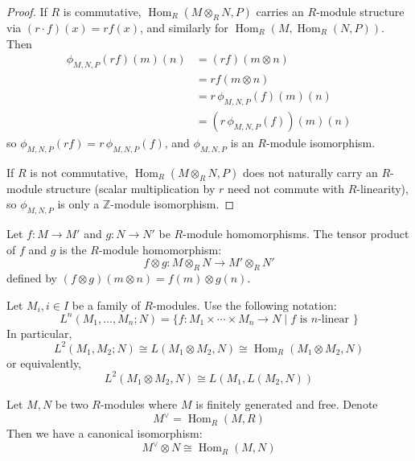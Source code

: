 \begin{proof}
    If $R$ is commutative, $\operatorname{Hom}_R(M\otimes_R N, P)$ carries an $R$-module structure via $(r\cdot f)(x) = rf(x)$, and similarly for $\operatorname{Hom}_R(M, \operatorname{Hom}_R(N,P))$. Then
    \begin{align*}
        \phi_{M,N,P}(rf)(m)(n) & = (rf)(m\otimes n)           \\
                               & = r f(m\otimes n)            \\
                               & = r\,\phi_{M,N,P}(f)(m)(n)   \\
                               & = (r\,\phi_{M,N,P}(f))(m)(n)
    \end{align*}
    so $\phi_{M,N,P}(rf) = r\,\phi_{M,N,P}(f)$, and $\phi_{M,N,P}$ is an $R$-module isomorphism.

    If $R$ is not commutative, $\operatorname{Hom}_R(M\otimes_R N, P)$ does not naturally carry an $R$-module structure (scalar multiplication by $r$ need not commute with $R$-linearity), so $\phi_{M,N,P}$ is only a $\mathbb{Z}$-module isomorphism.
\end{proof}

\begin{definition}
    Let $f: M\to M'$ and $g: N\to N'$ be $R$-module homomorphisms. The tensor product of $f$ and $g$ is the $R$-module homomorphism:
    \[
        f \otimes g: M \otimes_R N \to M' \otimes_R N'
    \]
    defined by $(f \otimes g)(m \otimes n) = f(m) \otimes g(n)$.
\end{definition}

\begin{definition}
    Let $M_i, i \in I$ be a family of $R$-modules. Use the following notation:
    \[
        L^n(M_1, \ldots, M_n; N) = \{ f: M_1 \times \cdots \times M_n \to N \mid f \text{ is $n$-linear } \}
    \]
    In particular,
    \[
        L^2(M_1, M_2; N) \cong L(M_1 \otimes M_2, N) \cong \operatorname{Hom}_R(M_1 \otimes M_2, N)
    \]
    or equivalently,
    \[
        L^2(M_1 \otimes M_2, N) \cong L(M_1, L(M_2, N))
    \]
\end{definition}

\begin{proposition}
    Let $M,N$ be two $R$-modules where $M$ is finitely generated and free. Denote
    \[
        M^{\vee} = \operatorname{Hom}_R(M, R)
    \]
    Then we have a canonical isomorphism:
    \[
        M^{\vee} \otimes N \cong \operatorname{Hom}_R(M, N)
    \]
\end{proposition}

